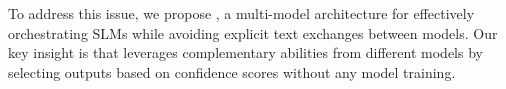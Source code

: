 




To address this issue, we propose \textbf{\NAME{}}, a multi-model architecture for effectively orchestrating SLMs while avoiding explicit text exchanges between models. Our key insight is that \NAME{} leverages complementary abilities from different models by selecting outputs based on confidence scores without any model training.




